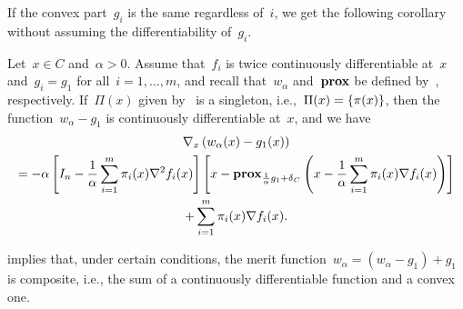 \documentclass[../../main]{subfiles}
\begin{document}
                        If the convex part~$g_i$ is the same regardless of~$i$, we get the following corollary without assuming the differentiability of~$g_i$.
                        \begin{corollary} 
                            Let~$x \in C$ and~$\alpha > 0$.
                            Assume that~$f_i$ is twice continuously differentiable at~$x$ and~$g_i = g_1$ for all~$i = 1, \dots, m$, and recall that~$w_\alpha$ and~$\prox$ be defined by~, respectively.
                            If~$\Pi(x)$ given by~ is a singleton, i.e.,~$\Pi(x) = \set*{\pi(x)}$, then the function~$w_\alpha - g_1$ is continuously differentiable at~$x$, and we have
                            \begin{multline}
                                \nabla_x \left( w_\alpha(x) - g_1(x) \right) \\
                                = - \alpha \left[ I_n - \frac{1}{\alpha} \sum_{i = 1}^{m} \pi_i(x) \nabla^2 f_i(x) \right] \left[x - \prox_{\frac{1}{\alpha} g_1 + \indicator_C} \left( x - \frac{1}{\alpha} \sum_{i = 1}^{m} \pi_i(x) \nabla f_i(x) \right) \right] \\
                                + \sum_{i = 1}^{m} \pi_i(x) \nabla f_i(x)
                            .\end{multline}
                        \end{corollary}
                         implies that, under certain conditions, the merit function~$w_\alpha = (w_\alpha - g_1) + g_1$ is composite, i.e., the sum of a continuously differentiable function and a convex one.
\end{document}
